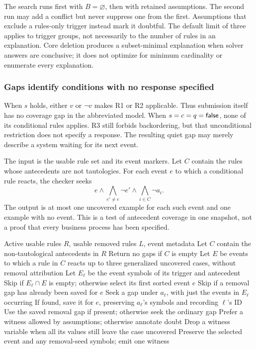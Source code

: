 The search runs first with $B=\varnothing$, then with retained assumptions.
The second run may add a conflict but never suppress one from the first.
Assumptions that exclude a rules-only trigger instead mark it doubtful.
The default limit of three applies to trigger groups, not necessarily to
the number of rules in an explanation. Core deletion produces a
subset-minimal explanation when solver answers are conclusive; it does
not optimize for minimum cardinality or enumerate every explanation.

\subsubsection{Gaps identify conditions with no response specified}
When $s$ holds, either $v$ or $\neg v$ makes R1 or R2 applicable. Thus
submission itself has no coverage gap in the abbreviated model. When
$s=c=q=\mathsf{false}$, none of its conditional rules applies. R3 still forbids
backordering, but that unconditional restriction does not specify a
response. The resulting quiet gap may merely describe a system waiting
for its next event.

The input is the usable rule set and its event markers. Let $C$ contain
the rules whose antecedents are not tautologies. For each event $e$ to
which a conditional rule reacts, the checker seeks
\[
 e\land\bigwedge_{e'\ne e}\neg e'
 \land\bigwedge_{i\in C}\neg a_i.
\]
The output is at most one uncovered example for each such event and one
example with no event. This is a test of antecedent coverage in one
snapshot, not a proof that every business process has been specified.

\begin{algorithm}[H]
\caption{Find and simplify uncovered situations}\label{alg:gaps}
\begin{algorithmic}[1]
\Require Active usable rules $R$, usable removed rules $L$, event metadata
\State Let $C$ contain the non-tautological antecedents in $R$
\State Return no gaps if $C$ is empty
\State Let $E$ be events to which a rule in $C$ reacts
  \State \Return up to three generalized uncovered cases, without removal attribution
\EndIf
{}
  \State Let $E_\ell$ be the event symbols of its trigger and antecedent
  \State Skip if $E_\ell\cap E$ is empty; otherwise select its first sorted event $e$
  \State Skip if a removal gap has already been saved for $e$
  \State Seek a gap under $a_\ell$, with just the events in $E_\ell$ occurring
  \State If found, save it for $e$, preserving $a_\ell$'s symbols and recording $\ell$'s ID
\EndFor
{}
  \State Use the saved removal gap if present; otherwise seek the ordinary gap
  \State Prefer a witness allowed by assumptions; otherwise annotate doubt
  \State Drop a witness variable when all its values still leave the case uncovered
  \State Preserve the selected event and any removal-seed symbols; emit one witness
\EndFor
\end{algorithmic}
\end{algorithm}

